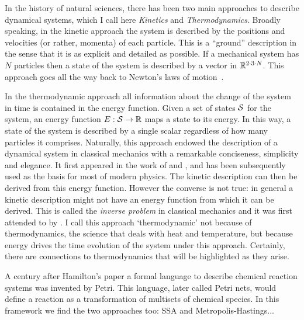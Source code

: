 % 
In the history of natural sciences,
there has been two main approaches to describe dynamical systems,
which I call here
\emph{Kinetics} and \emph{Thermodynamics}.
Broadly speaking, in the kinetic approach
the system is described by the positions and velocities
(or rather, momenta)
of each particle.
This is a ``ground'' description in the sense that
it is as explicit and detailed as possible.
If a mechanical system has $N$ particles
then a state of the system is described by
a vector in $\mathbb{R}^{2 \cdot 3 \cdot N}$.
This approach goes all the way back to
Newton's laws of motion~\citep{newton}.

In the thermodynamic approach
all information about the change of the system in time
is contained in the energy function.
Given a set of states $\mathcal{S}$ for the system,
an energy function $E: \mathcal{S} \to \mathbb{R}$ maps a state to its energy.
In this way, a state of the system is described by a single scalar
regardless of how many particles it comprises.
Naturally, this approach endowed the description of
a dynamical system in classical mechanics
with a remarkable conciseness, simplicity and elegance.
It first appeared in the work of
\citet{lagrange2} and \citet{hamilton},
and has been subsequently used as the basis for most of modern physics.
The kinetic description can then be derived from this energy function.
However the converse is not true:
in general a kinetic description might not have an energy function
from which it can be derived. %
This is called the \emph{inverse problem} in classical mechanics
\citep{santilli} and it was first attended to by \citet{helmholtz}.
I call this approach `thermodynamic' not because of thermodynamics,
the science that deals with heat and temperature,
but because energy drives the time evolution
of the system under this approach.
Certainly, there are connections to thermodynamics
that will be highlighted as they arise.

A century after Hamilton's paper
a formal language to describe chemical reaction systems
was invented by Petri. %
This language, later called Petri nets,
would define a reaction as a transformation of
multisets of chemical species.
In this framework we find the two approaches too:
SSA and Metropolis-Hastings...

